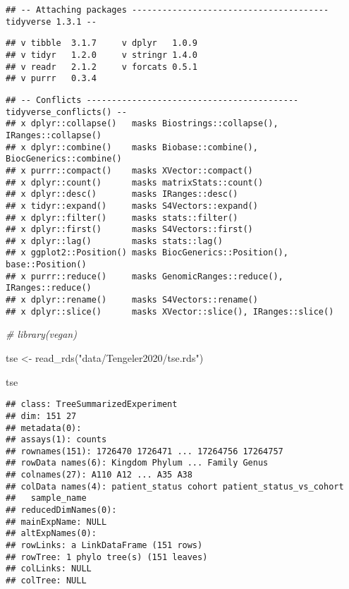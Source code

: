 \documentclass[
  oneside]{book}
\newenvironment{Shaded}{\begin{snugshade}}{\end{snugshade}}
\newcommand{\CommentTok}[1]{\textcolor[rgb]{0.56,0.35,0.01}{\textit{#1}}}
\newcommand{\FunctionTok}[1]{\textcolor[rgb]{0.00,0.00,0.00}{#1}}
\newcommand{\NormalTok}[1]{#1}
\newcommand{\OtherTok}[1]{\textcolor[rgb]{0.56,0.35,0.01}{#1}}
\newcommand{\StringTok}[1]{\textcolor[rgb]{0.31,0.60,0.02}{#1}}
\begin{document}
\begin{verbatim}
## -- Attaching packages --------------------------------------- tidyverse 1.3.1 --
\end{verbatim}

\begin{verbatim}
## v tibble  3.1.7     v dplyr   1.0.9
## v tidyr   1.2.0     v stringr 1.4.0
## v readr   2.1.2     v forcats 0.5.1
## v purrr   0.3.4
\end{verbatim}

\begin{verbatim}
## -- Conflicts ------------------------------------------ tidyverse_conflicts() --
## x dplyr::collapse()   masks Biostrings::collapse(), IRanges::collapse()
## x dplyr::combine()    masks Biobase::combine(), BiocGenerics::combine()
## x purrr::compact()    masks XVector::compact()
## x dplyr::count()      masks matrixStats::count()
## x dplyr::desc()       masks IRanges::desc()
## x tidyr::expand()     masks S4Vectors::expand()
## x dplyr::filter()     masks stats::filter()
## x dplyr::first()      masks S4Vectors::first()
## x dplyr::lag()        masks stats::lag()
## x ggplot2::Position() masks BiocGenerics::Position(), base::Position()
## x purrr::reduce()     masks GenomicRanges::reduce(), IRanges::reduce()
## x dplyr::rename()     masks S4Vectors::rename()
## x dplyr::slice()      masks XVector::slice(), IRanges::slice()
\end{verbatim}

\begin{Shaded}
\begin{Highlighting}[]
\CommentTok{\# library(vegan)}

\NormalTok{tse }\OtherTok{\textless{}{-}} \FunctionTok{read\_rds}\NormalTok{(}\StringTok{"data/Tengeler2020/tse.rds"}\NormalTok{)}

\NormalTok{tse}
\end{Highlighting}
\end{Shaded}

\begin{verbatim}
## class: TreeSummarizedExperiment 
## dim: 151 27 
## metadata(0):
## assays(1): counts
## rownames(151): 1726470 1726471 ... 17264756 17264757
## rowData names(6): Kingdom Phylum ... Family Genus
## colnames(27): A110 A12 ... A35 A38
## colData names(4): patient_status cohort patient_status_vs_cohort
##   sample_name
## reducedDimNames(0):
## mainExpName: NULL
## altExpNames(0):
## rowLinks: a LinkDataFrame (151 rows)
## rowTree: 1 phylo tree(s) (151 leaves)
## colLinks: NULL
## colTree: NULL
\end{verbatim}
\end{document}
